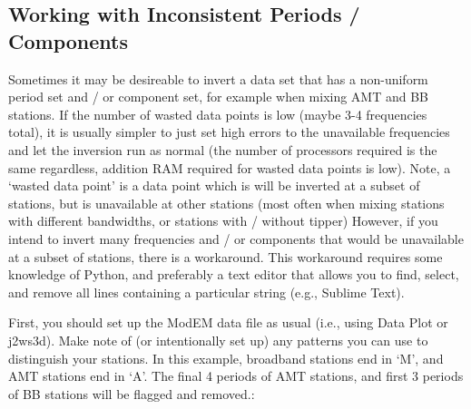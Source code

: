 \documentclass[letterpaper,10pt,english]{sphinxmanual}
\begin{document}
\subsection{Working with Inconsistent Periods / Components}
\label{\detokenize{content/examples/recipes:working-with-inconsistent-periods-components}}
Sometimes it may be desireable to invert a data set that has a non-uniform period set and / or component set, for example when mixing AMT and BB stations. If the number of wasted data points is low (maybe 3-4 frequencies total), it is usually simpler to just set high errors to the unavailable frequencies and let the inversion run as normal (the number of processors required is the same regardless, addition RAM required for wasted data points is low).
Note, a ‘wasted data point’ is a data point which is will be inverted at a subset of stations, but is unavailable at other stations (most often when mixing stations with different bandwidths, or stations with / without tipper)
However, if you intend to invert many frequencies and / or components that would be unavailable at a subset of stations, there is a workaround. This workaround requires some knowledge of Python, and preferably a text editor that allows you to find, select, and remove all lines containing a particular string (e.g., Sublime Text).

First, you should set up the ModEM data file as usual (i.e., using Data Plot or j2ws3d).
Make note of (or intentionally set up) any patterns you can use to distinguish your stations. In this example, broadband stations end in ‘M’, and AMT stations end in ‘A’. The final 4 periods of AMT stations, and first 3 periods of BB stations will be flagged and removed.:
\end{document}
